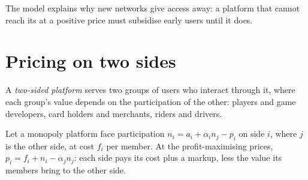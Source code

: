 \begin{omfigure}
\par{}
\end{omfigure}

The model explains why new networks give access away: a platform that cannot reach
its  at a positive price must subsidise early users until it does.

\section{Pricing on two sides}\label{sec:b3:platforms-and-innovation:two-sided}

\begin{definition}\label{def:b3:platforms-and-innovation:two-sided}
A \emph{two-sided platform} serves two groups of users who interact through it, where
each group's value depends on the participation of the other: players and game
developers, card holders and merchants, riders and drivers.
\end{definition}

\begin{proposition}\label{prop:b3:platforms-and-innovation:two-sided}
Let a monopoly platform face participation $n_i = a_i + \alpha_i n_j - p_i$ on side $i$, where $j$ is the other side, at cost $f_i$
per member. At the profit-maximising prices, $p_i = f_i + n_i - \alpha_j n_j$: each side pays its cost plus a
markup, less the value its members bring to the other side.
\end{proposition}

